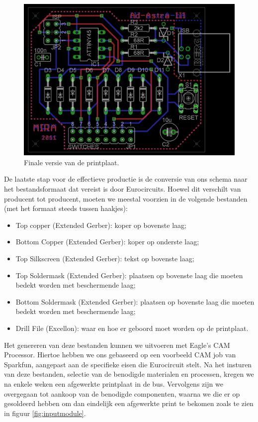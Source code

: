 \begin{figure}
	\includegraphics[width=\textwidth]{afbeeldingen/inputmodule_pcb}
	\caption{Finale versie van de printplaat.}
	\label{fig:printplaat}
\end{figure}

De laatste stap voor de effectieve productie is de conversie van ons schema naar het bestandsformaat dat vereist is door Eurocircuits. Hoewel dit verschilt van producent tot producent, moeten we meestal voorzien in de volgende bestanden (met het formaat steeds tussen haakjes):
\begin{itemize}
  \item Top copper (Extended Gerber): koper op bovenste laag;
  \item Bottom Copper (Extended Gerber): koper op onderste laag;
  \item Top Silkscreen (Extended Gerber): tekst op bovenste laag;
  \item Top Soldermask (Extended Gerber): plaatsen op bovenste laag die moeten bedekt worden met beschermende laag;
  \item Bottom Soldermask (Extended Gerber): plaatsen op bovenste laag die moeten bedekt worden met beschermende laag;
  \item Drill File (Excellon): waar en hoe er geboord moet worden op de printplaat.
\end{itemize}

Het genereren van deze bestanden kunnen we uitvoeren met Eagle's CAM Processor. Hiertoe hebben we ons gebaseerd op een voorbeeld CAM job van Sparkfun, aangepast aan de specifieke eisen die Eurocircuit stelt. Na het insturen van deze bestanden, selectie van de benodigde materialen en processen, kregen we na enkele weken een afgewerkte printplaat in de bus. Vervolgens zijn we overgegaan tot aankoop van de benodigde componenten, waarna we die er op gesoldeerd hebben om dan eindelijk een afgewerkte print te bekomen zoals te zien in figuur \ref{fig:inputmodule}.

